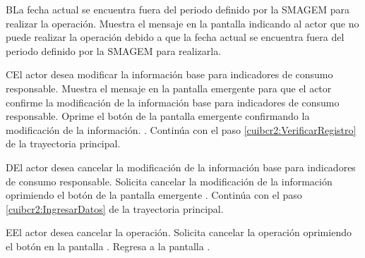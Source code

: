    \begin{UCtrayectoriaA}{B}{La fecha actual se encuentra fuera del periodo definido por la SMAGEM para realizar la operación.}
    \UCpaso[\UCsist] Muestra el mensaje  en la pantalla  indicando al actor que no puede realizar la operación debido a que la fecha actual se encuentra fuera del periodo definido por la SMAGEM para realizarla. 
 \end{UCtrayectoriaA}
 
  \begin{UCtrayectoriaA}{C}{El actor desea modificar la información base para indicadores de consumo responsable.}
    \UCpaso[\UCsist] Muestra el mensaje  en la pantalla emergente  para que el actor confirme la modificación de la información base para indicadores de consumo responsable.
    \UCpaso[\UCactor] Oprime el botón  de la pantalla emergente  confirmando la modificación de la información. .
    \UCpaso[] Continúa con el paso \ref{cuibcr2:VerificarRegistro} de la trayectoria principal.    
 \end{UCtrayectoriaA}
 
   \begin{UCtrayectoriaA}{D}{El actor desea cancelar la modificación de la información base para indicadores de consumo responsable.}
    \UCpaso[\UCactor] Solicita cancelar la modificación de la información oprimiendo el botón  de la pantalla emergente .
    \UCpaso[] Continúa con el paso \ref{cuibcr2:IngresarDatos} de la trayectoria principal.    
 \end{UCtrayectoriaA}
 
    \begin{UCtrayectoriaA}{E}{El actor desea cancelar la operación.}
    \UCpaso[\UCactor] Solicita cancelar la operación oprimiendo el botón  en la pantalla .
    \UCpaso[] Regresa a la pantalla . 
    \end{UCtrayectoriaA}
  

